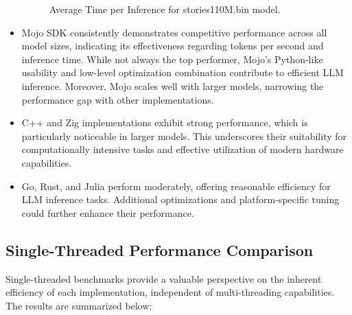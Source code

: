 \documentclass[conference]{IEEEtran}
\begin{document}
\begin{itemize}
      \begin{figure}[h]
        \centering
        \caption{Average Time per Inference for stories110M.bin model.}
      \end{figure}


    \item Mojo SDK consistently demonstrates competitive performance across all model sizes, indicating its effectiveness regarding tokens per second and inference time. While not always the top performer, Mojo's Python-like usability and low-level optimization combination contribute to efficient LLM inference. Moreover, Mojo scales well with larger models, narrowing the performance gap with other implementations.
      \item C++ and Zig implementations exhibit strong performance, which is particularly noticeable in larger models. This underscores their suitability for computationally intensive tasks and effective utilization of modern hardware capabilities.
      \item Go, Rust, and Julia perform moderately, offering reasonable efficiency for LLM inference tasks. Additional optimizations and platform-specific tuning could further enhance their performance.
\end{itemize}


\subsection{Single-Threaded Performance Comparison}
Single-threaded benchmarks provide a valuable perspective on the inherent efficiency of each implementation, independent of multi-threading capabilities. The results are summarized below:
\end{document}
